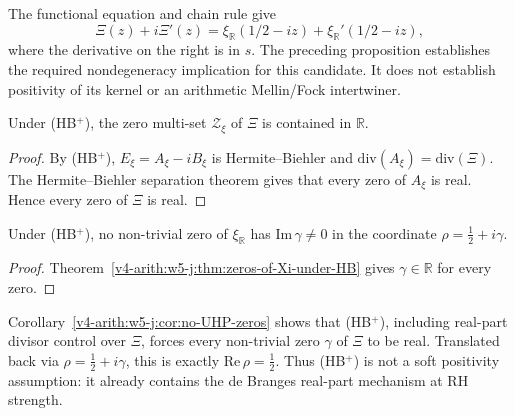 \begin{remark}
The functional equation and chain rule give
\[
 \Xi(z)+i\Xi'(z)=\xi_{\mathbb R}(1/2-iz)
                   +\xi_{\mathbb R}'(1/2-iz),
\]
where the derivative on the right is in \(s\).
The preceding proposition establishes the required nondegeneracy
implication for this candidate. It does not establish positivity
of its kernel or an arithmetic Mellin/Fock intertwiner.
\end{remark}

\begin{theorem}
\label{v4-arith:w5-j:thm:zeros-of-Xi-under-HB}
Under (HB\(^{+}\)), the zero multi-set
\(\mathcal{Z}_{\xi}\) of \(\Xi\) is contained in \(\mathbb R\).
\end{theorem}

\begin{proof}
By (HB\(^{+}\)), \(E_{\xi}=A_{\xi}-iB_{\xi}\) is
Hermite--Biehler and \(\mathrm{div}(A_{\xi})=\mathrm{div}(\Xi)\).
The Hermite--Biehler separation theorem gives that every zero of
\(A_{\xi}\) is real. Hence every zero of \(\Xi\) is real.
\end{proof}

\begin{corollary}
\label{v4-arith:w5-j:cor:no-UHP-zeros}
Under (HB\(^{+}\)), no non-trivial zero of
\(\xi_{\mathbb R}\) has \(\mathrm{Im}\,\gamma\neq0\) in the
coordinate \(\rho=\tfrac12+i\gamma\).
\end{corollary}

\begin{proof}
Theorem~\ref{v4-arith:w5-j:thm:zeros-of-Xi-under-HB} gives
\(\gamma\in\mathbb R\) for every zero.
\end{proof}

\begin{remark}
\label{v4-arith:w5-j:rem:HBplus-alone}
Corollary~\ref{v4-arith:w5-j:cor:no-UHP-zeros} shows that (HB\(^{+}\)),
including real-part divisor control over \(\Xi\), forces every non-trivial zero
\(\gamma\) of \(\Xi\) to be real. Translated back via
\(\rho=\tfrac{1}{2}+i\gamma\), this is exactly
\(\mathrm{Re}\,\rho=\tfrac{1}{2}\).  Thus (HB\(^{+}\)) is not a
soft positivity assumption: it already contains the de Branges
real-part mechanism at RH strength.
\end{remark}

